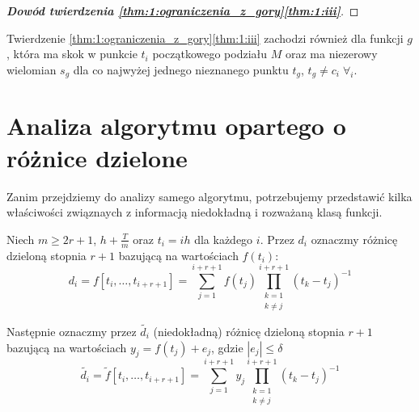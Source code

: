 \documentclass[oik, pdftex, robocza, man]{mgrwms}
\begin{document}
\begin{proof}[\textbf{Dowód twierdzenia \ref{thm:1:ograniczenia_z_gory}\ref{thm:1:iii}}]
    \end{proof}

    \begin{uw}
        Twierdzenie \ref{thm:1:ograniczenia_z_gory}\ref{thm:1:iii} zachodzi również dla funkcji $g$, która ma skok w punkcie $t_{i}$ początkowego podziału $M$ oraz ma niezerowy wielomian $s_{g}$ dla co najwyżej jednego nieznanego punktu $t_{g}$, $t_{g} \neq c_{i} \; \forall_{i}$.
    \end{uw}


\section{Analiza algorytmu opartego o różnice dzielone}


    Zanim przejdziemy do analizy samego algorytmu, potrzebujemy przedstawić kilka właściwości związnaych z informacją niedokładną i rozważaną klasą funkcji.

    Niech $m \geq 2r + 1$, $h + \frac{T}{m}$ oraz $t_{i} = ih$ dla każdego $i$. Przez $d_{i}$ oznaczmy różnicę dzieloną stopnia $r+1$ bazującą na wartościach $f(t_{i})$:
    \begin{equation*}
        d_{i} = f[t_{i}, \dots, t_{i+r+1}] = \sum_{j = 1}^{i+r+1} f(t_{j}) \prod_{\substack{k=1 \\ k \neq j}}^{i+r+1}(t_{k}-t_{j})^{-1}
    \end{equation*}

    Następnie oznaczmy przez $\tilde{d_i}$ (niedokładną) różnicę dzieloną stopnia $r+1$ bazującą na wartościach $y_{j} = f(t_{j}) + e_{j}$, gdzie $|e_{j}| \leq \delta$
    \begin{equation*}
        \tilde{d_{i}} = \tilde{f}[t_{i}, \dots, t_{i+r+1}] = \sum_{j = 1}^{i+r+1} y_{j} \prod_{\substack{k=1 \\ k \neq j}}^{i+r+1}(t_{k}-t_{j})^{-1}
    \end{equation*}
\end{document}
